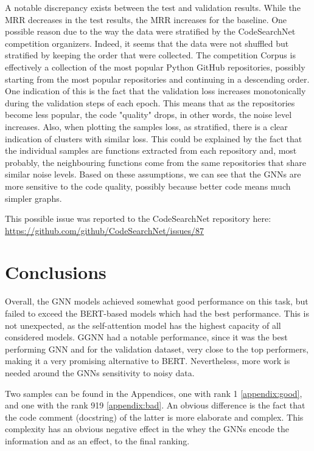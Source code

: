 \documentclass{article}
\begin{document}
A notable discrepancy exists between the test and validation results. While the MRR decreases in the test results, the MRR increases for the baseline. One possible reason due to the way the data were stratified by the CodeSearchNet competition organizers. Indeed, it seems that the data were not shuffled but stratified by keeping the order that were collected. The competition Corpus is effectively a collection of the most popular Python GitHub repositories, possibly starting from the most popular repositories and continuing in a descending order. One indication of this is the fact that the validation loss increases monotonically during the validation steps of each epoch. This means that as the repositories become less popular, the code "quality" drops, in other words, the noise level increases.
Also, when plotting the samples loss, as stratified, there is a clear indication of clusters with similar loss. This could be explained by the fact that the individual samples are functions extracted from each repository and, most probably, the neighbouring functions come from the same repositories that share similar noise levels.
Based on these assumptions, we can see that the GNNs are more sensitive to the code quality, possibly because better code means much simpler graphs.

This possible issue was reported to the CodeSearchNet repository here:  \url{https://github.com/github/CodeSearchNet/issues/87}

\section{Conclusions}
Overall, the GNN models achieved somewhat good performance on this task, but failed to exceed the BERT-based models which had the best performance. This is not unexpected, as the self-attention model has the highest capacity of all considered models. GGNN had a notable performance, since it was the best performing GNN and for the validation dataset, very close to the top performers, making it a very promising alternative to BERT. Nevertheless, more work is needed around the GNNs sensitivity to noisy data.

Two samples can be found in the Appendices, one with rank 1 \autoref{appendix:good}, and one with the rank 919 \autoref{appendix:bad}. An obvious difference is the fact that the code comment (docstring) of the latter is more elaborate and complex. This complexity has an obvious negative effect in the whey the GNNs encode the information and as an effect, to the final ranking.
\end{document}
